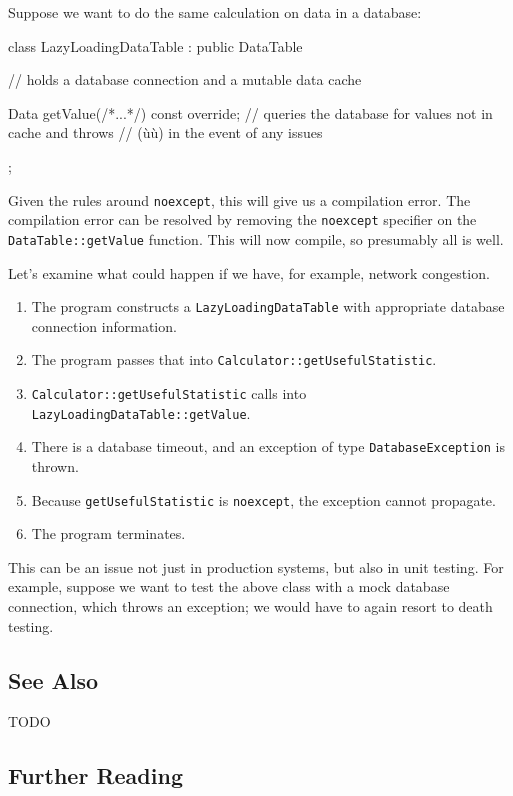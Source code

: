 \noindent Suppose we want to do the same calculation on data in a database:

\begin{emcppslisting}[emcppsbatch=e31,emcppserrorlines={5}]
class LazyLoadingDataTable : public DataTable
{
    // holds a database connection and a mutable data cache

    Data getValue(/*...*/) const override;
        // queries the database for values not in cache and throws
        // (ù{}ù) in the event of any issues
};
\end{emcppslisting}
    

\noindent Given the rules around \lstinline!noexcept!, this will give us a
compilation error. The compilation error can be resolved by removing the
\lstinline!noexcept! specifier on the \lstinline!DataTable::getValue!
function. This will now compile, so presumably all is well.

Let's examine what could happen if we have, for example, network
congestion.
\begin{enumerate}
\item{The program constructs a \lstinline!LazyLoadingDataTable! with appropriate database connection information.}
\item{The program passes that into \lstinline!Calculator::getUsefulStatistic!.}
\item{\lstinline!Calculator::getUsefulStatistic! calls into \lstinline!LazyLoadingDataTable::getValue!.}
\item{There is a database timeout, and an exception of type \lstinline!DatabaseException! is thrown.}
\item{Because \lstinline!getUsefulStatistic! is \lstinline!noexcept!, the exception cannot propagate.}
\item{The program terminates.}
\end{enumerate}
This can be an issue not just in production systems, but also in unit
testing. For example, suppose we want to test the above class with a
mock database connection, which throws an exception; we would have to
again resort to death testing.

\subsection[See Also]{See Also}\label{see-also}

TODO

\subsection[Further Reading]{Further Reading}\label{further-reading}

